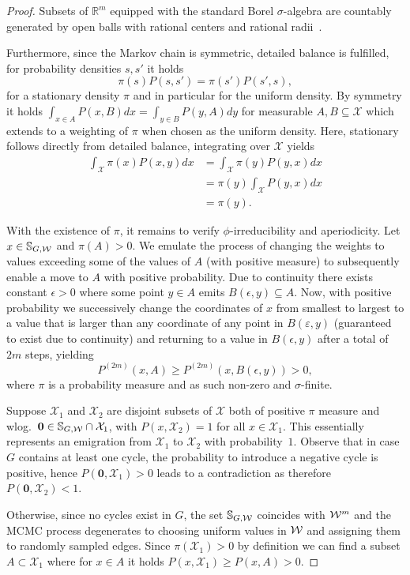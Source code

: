 \begin{proof}
    Subsets of $\mathbb R^m$ equipped with the standard Borel $\sigma$-algebra are countably generated by open balls with rational centers and rational radii~\cite{RobertsRosenthal04}.

    Furthermore, since the Markov chain is symmetric, detailed balance is fulfilled, \ie for probability densities $s, s'$ it holds
    \[ \pi(s)P(s, s') = \pi(s')P(s', s), \]
    for a stationary density $\pi$ and in particular for the uniform density. 
    By symmetry it holds $\int_{x \in A}P(x, B)dx = \int_{y \in B}P(y, A)dy$ for measurable $A, B \subseteq \mathcal X$ which extends to a weighting of $\pi$ when chosen as the uniform density.
    Here, stationary follows directly from detailed balance, \ie integrating over $\mathcal X$ yields
    \begin{align*}
        \int_{\mathcal X} \pi(x)P(x, y)dx &= \int_{\mathcal X} \pi(y)P(y, x)dx \\
                                          &= \pi(y)\int_{\mathcal X} P(y, x)dx \\
                                          &= \pi(y).
    \end{align*}
    
    With the existence of $\pi$, it remains to verify $\phi$-irreducibility and aperiodicity.
    Let $x \in \mathbb{S}_{G, \mathcal W}$ and $\pi(A) > 0$.
    We emulate the process of changing the weights to values exceeding some of the values of $A$ (with positive measure) to subsequently enable a move to $A$ with positive probability.
    Due to continuity there exists constant $\epsilon > 0$ where some point $y \in A$ emits $B(\epsilon, y) \subseteq A$.
    Now, with positive probability we successively change the coordinates of $x$ from smallest to largest to a value that is larger than any coordinate of any point in $B(\varepsilon, y)$ (guaranteed to exist due to continuity) and returning to a value in $B(\epsilon, y)$ after a total of $2m$ steps, yielding
    \[ P^{(2m)}(x, A) \ge P^{(2m)}(x, B(\epsilon, y)) > 0, \]
    where $\pi$ is a probability measure and as such non-zero and $\sigma$-finite.

    Suppose $\mathcal X_1$ and $\mathcal X_2$ are disjoint subsets of $\mathcal X$ both of positive $\pi$ measure and wlog.~$\mathbf{0} \in \mathbb{S}_{G, \mathcal W} \cap \mathcal X_1$, with $P(x, \mathcal X_2) = 1$ for all $x \in \mathcal X_1$. 
    This essentially represents an emigration from $\mathcal X_1$ to $\mathcal X_2$ with probability~$1$.
    Observe that in case $G$ contains at least one cycle, the probability to introduce a negative cycle is positive, hence $P(\mathbf{0}, \mathcal X_1) > 0$ leads to a contradiction as therefore $P(\mathbf{0}, \mathcal X_2) < 1$.
    
    Otherwise, since no cycles exist in $G$, the set $\mathbb{S}_{G, \mathcal W}$ coincides with $\mathcal W^m$ and the MCMC process degenerates to choosing uniform values in $\mathcal W$ and assigning them to randomly sampled edges. 
    Since $\pi(\mathcal X_1) > 0$ by definition we can find a subset $A \subset \mathcal X_1$ where for $x \in A$ it holds $P(x, \mathcal X_1) \ge P(x, A) > 0$.
\end{proof}



